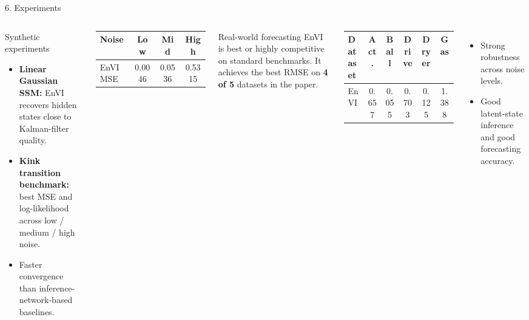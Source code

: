 \documentclass[aspectratio=169,11pt]{beamer}
\begin{document}
\begin{frame}{6. Experiments}
\small
\begin{columns}[T,totalwidth=\textwidth]
\begin{block}{Synthetic experiments}
\begin{itemize}
  \item \textbf{Linear Gaussian SSM:} EnVI recovers hidden states close to Kalman-filter quality.
  \item \textbf{Kink transition benchmark:} best MSE and log-likelihood across low / medium / high noise.
  \item Faster convergence than inference-network-based baselines.
\end{itemize}
\end{block}

\vspace{1mm}
\begin{tabular}{lccc}
\toprule
Noise & Low & Mid & High \\
\midrule
EnVI MSE & 0.0046 & 0.0536 & 0.5315 \\
\bottomrule
\end{tabular}

\begin{block}{Real-world forecasting}
EnVI is best or highly competitive on standard benchmarks. It achieves the best RMSE on \textbf{4 of 5} datasets in the paper.
\end{block}

\vspace{1mm}
\begin{tabular}{lccccc}
\toprule
Dataset & Act. & Ball & Drive & Dryer & Gas \\
\midrule
EnVI & 0.657 & 0.055 & 0.703 & 0.125 & 1.388 \\
\bottomrule
\end{tabular}

\vspace{2mm}
\begin{itemize}
  \item Strong robustness across noise levels.
  \item Good latent-state inference and good forecasting accuracy.
\end{itemize}
\end{columns}
\end{frame}
\end{document}
